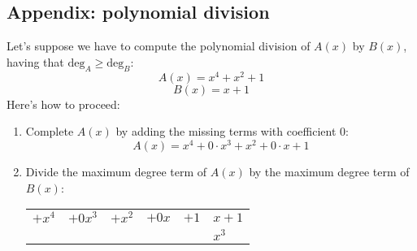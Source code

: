 \hypertarget{polDiv}{\subsection{Appendix: polynomial division}}
Let's suppose we have to compute the polynomial division of $A(x)$ by $B(x)$, having that $\text{deg}_A\ge\text{deg}_B$:
$$A(x)=x^4+x^2+1$$
$$B(x)=x+1$$
Here's how to proceed:
\begin{enumerate}
    \item Complete $A(x)$ by adding the missing terms with coefficient 0:
    $$A(x)=x^4+0\cdot x^3+x^2+0\cdot x+1$$
    \item Divide the maximum degree term of $A(x)$ by the maximum degree term of $B(x)$:
    \begin{center}
        \begin{tabular}{ccccc|l}
             $+x^4$ & $+0 x^3$ & $+x^2$ & $+0 x$ & $+1$ & $x+1$ \\
             \cline{6-6}
                    &          &        &        &      & $x^3$
             

\end{tabular}
\end{center}
\end{enumerate}

